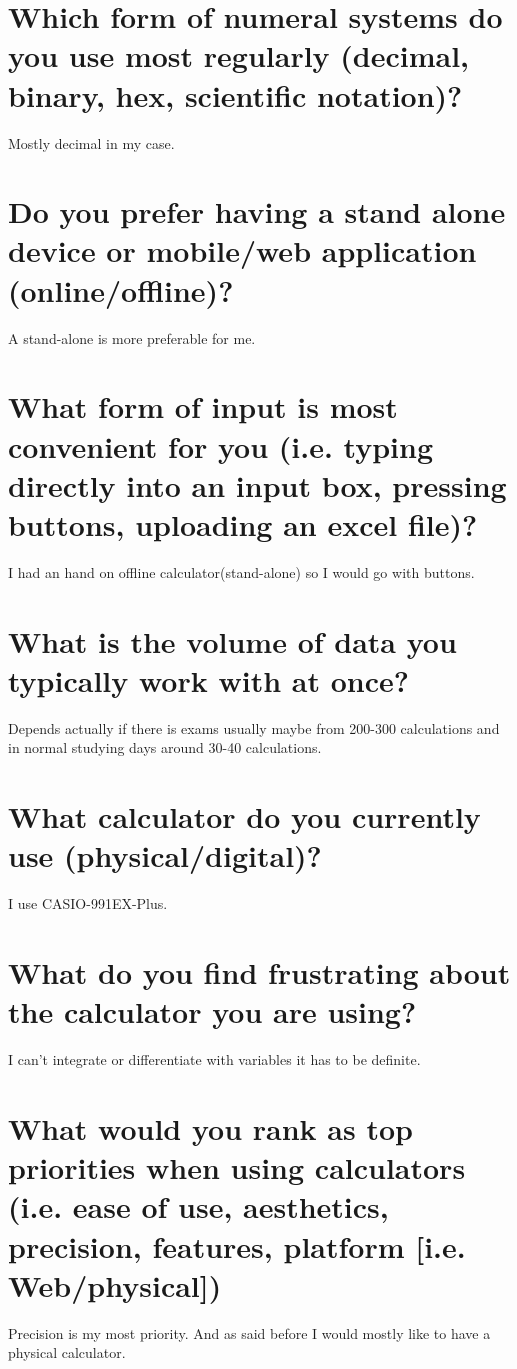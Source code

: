 \documentclass{article}
\begin{document}
\section*{\large{Which form of numeral systems do you use most regularly (decimal, binary, hex, scientific
notation)?}}
Mostly decimal in my case.

\section*{\large{Do you prefer having a stand alone device or mobile/web application (online/offline)?}}
A stand-alone is more preferable for me.

\section*{\large{What form of input is most convenient for you (i.e. typing directly into an input box,
pressing buttons, uploading an excel file)?}}
I had an hand on offline calculator(stand-alone) so I would go with buttons.

\section*{\large{What is the volume of data you typically work with at once?}}
Depends actually if there is exams usually maybe from 200-300 calculations and in normal
studying days around 30-40 calculations.

\section*{\large{What calculator do you currently use (physical/digital)?}}
I use CASIO-991EX-Plus.

\section*{\large{What do you find frustrating about the calculator you are using?}}
I can't integrate or differentiate with variables it has to be definite.

\section*{\large{What would you rank as top priorities when using calculators (i.e. ease of use, aesthetics,
precision, features, platform [i.e. Web/physical])}}
Precision is my most priority. And as said before I would mostly like to have a physical
calculator.
\end{document}
